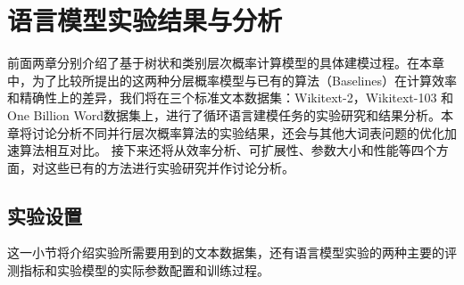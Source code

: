 
\chapter{语言模型实验结果与分析}
前面两章分别介绍了基于树状和类别层次概率计算模型的具体建模过程。在本章中，为了比较所提出的这两种分层概率模型与已有的算法（Baselines）在计算效率和精确性上的差异，我们将在三个标准文本数据集：Wikitext-2，Wikitext-103 和 One Billion Word数据集上，进行了循环语言建模任务的实验研究和结果分析。本章将讨论分析不同并行层次概率算法的实验结果，还会与其他大词表问题的优化加速算法相互对比。 接下来还将从效率分析、可扩展性、参数大小和性能等四个方面，对这些已有的方法进行实验研究并作讨论分析。

\section{实验设置}
这一小节将介绍实验所需要用到的文本数据集，还有语言模型实验的两种主要的评测指标和实验模型的实际参数配置和训练过程。
